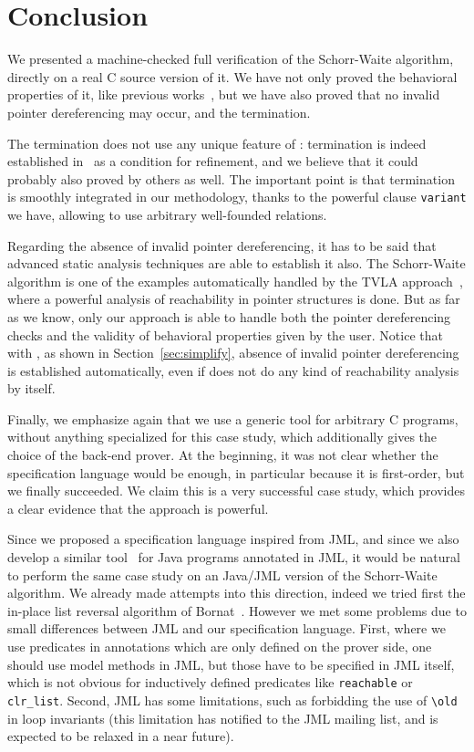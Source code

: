 \section{Conclusion}
\label{sec:conclusion}

We presented a machine-checked full verification of the Schorr-Waite
algorithm, directly on a real C source version of it. We have not only
proved the behavioral properties of it, like previous
works~\cite{bornat00mpc,mehta03cade,abrial03fme}, but we have also
proved that no invalid pointer dereferencing may occur, and the
termination.

The termination does not use any unique feature of \caduceus{}:
termination is indeed established in~\cite{abrial03fme} as a condition
for refinement, and we believe that it could probably also proved by
others as well. The important point is that termination is smoothly
integrated in our methodology, thanks to the powerful clause
\texttt{variant} we have, allowing to use arbitrary well-founded
relations.

Regarding the absence of invalid pointer dereferencing, it has to be
said that advanced static analysis techniques are able to establish it
also. The Schorr-Waite algorithm is one of the examples automatically
handled by the TVLA approach~\cite{sagiv02toplas,reps03esop}, where a powerful
analysis of reachability in pointer structures is done. But as far as
we know, only our approach is able to handle both the pointer
dereferencing checks and the validity of behavioral properties given
by the user. Notice that with \caduceus, as shown in
Section~\ref{sec:simplify}, absence of invalid pointer dereferencing
is established automatically, even if \caduceus{} does not do any kind of
reachability analysis by itself.

Finally, we emphasize again that we use a generic tool for arbitrary C
programs, without anything specialized for this case study, which
additionally gives the choice of the back-end prover. At the
beginning, it was not clear whether the \caduceus{} specification
language would be enough, in particular because it is first-order, but
we finally succeeded.  We claim this is a very successful case study,
which provides a clear evidence that the \caduceus{} approach is
powerful. 

Since we proposed a specification language inspired from JML, and
since we also develop a similar
tool~\cite{marche04jlap,marche05tphols} for Java programs annotated in
JML, it would be natural to perform the same case study on an Java/JML
version of the Schorr-Waite algorithm. We already made attempts into
this direction, indeed we tried first the in-place list
reversal algorithm of
Bornat~\cite{bornat00mpc,filliatre04icfem}. However we met some 
problems due to small differences between JML and our specification
language. First, where we use predicates in annotations which are only
defined on the prover side, one should use model methods in JML, but
those have to be specified in JML itself, which is not obvious for
inductively defined predicates like \verb|reachable| or \verb|clr_list|.
Second, JML has some limitations, such as forbidding the use of
\verb|\old| in loop invariants (this limitation has notified to the JML 
mailing list, and is expected to be relaxed in a near future). 

